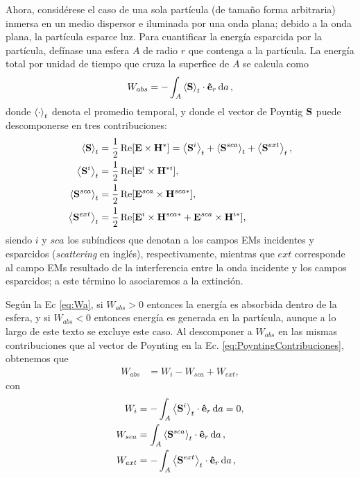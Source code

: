 Ahora, considérese el caso de una sola partícula (de tamaño  forma arbitraria) inmersa en un medio dispersor e iluminada por una onda plana; debido a la onda plana, la partícula esparce luz.  Para cuantificar la energía esparcida por la partícula, defínase una esfera $A$ de radio $r$ que contenga a la partícula. La energía total  por unidad de tiempo que cruza la superfice de $A$ se calcula como
%
\begin{align}
W_{abs} = -\int_A \ev{\vb{S}}_t\cdot \vu{e}_r \dd{a},
\label{eq:Wa}
\end{align}
%
donde $\ev{\cdot}_t$ denota el promedio temporal, y donde el vector de Poyntig $\vb{S}$ puede descomponerse en tres contribuciones:
%
\begin{align}
\ev{\vb{S}}_t &= \frac12 \Re[\vb{E}\times\vb{H}^*] = \ev{\vb{S}^i}_t + \ev{\vb{S}^{sca}}_t + \ev{\vb{S}^{ext}}_t,
\label{eq:PoyntingContribuciones}\\
\ev{\vb{S}^i}_t &= \frac12 \Re[\vb{E}^i\times\vb{H}^{*i}], \\
\ev{ \vb{S}^{sca}}_t &= \frac12 \Re[\vb{E}^{sca}\times\vb{H}^{sca*}] ,\\
\ev{\vb{S}^{ext}}_t &= \frac12 \Re[\vb{E}^i\times\vb{H}^{sca*} + \vb{E}^{sca} \times\vb{H}^{i*}],
\label{eq:Sext}
\end{align}
%
siendo $i$ y $sca$ los subíndices que denotan a los campos EMs incidentes y esparcidos (\textit{scattering} en inglés), respectivamente, mientras que $ext$ corresponde al campo EMs resultado de la interferencia entre la onda incidente y los campos esparcidos; a este término lo asociaremos a la extinción.

Según la Ec \eqref{eq:Wa}, si $W_{abs}>0$ entonces la energía es absorbida dentro de la esfera, y si $W_{abs}<0$ entonces energía es generada en la partícula, aunque a lo largo de este texto se excluye este caso. Al descomponer a $W_{abs}$ en las mismas contribuciones que al  vector de Poynting en la Ec. \eqref{eq:PoyntingContribuciones}, obtenemos que
%
\begin{align}
W_{abs} &= W_i - W_{sca} + W_{ext},
\end{align}
%
con
%
\begin{align}
W_{i} &= -\int_A\ev{\vb{S}^i}_t\cdot \vu{e}_r \dd{a} = 0,\\
W_{sca} &= \int_A\ev{\vb{S}^{sca}}_t\cdot \vu{e}_r \dd{a},\label{eq:Wsca}\\
W_{ext} &= -\int_A\ev{\vb{S}^{ext}}_t\cdot \vu{e}_r \dd{a},
\end{align}

